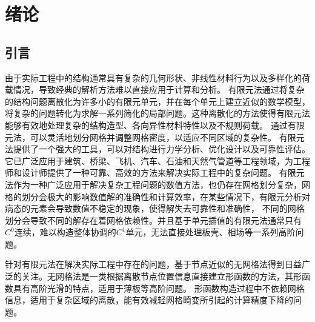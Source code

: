 \chapter{绪论}
\section{引言}
由于实际工程中的结构通常具有复杂的几何形状、非线性材料行为以及多样化的荷载情况，导致经典的解析方法难以直接应用于计算和分析。
有限元法通过将复杂的结构问题离散化为许多小的有限元单元，并在每个单元上建立近似的数学模型，将复杂的问题转化为求解一系列简化的局部问题。这种离散化的方法使得有限元法能够有效地处理复杂的结构造型、各向异性材料特性以及不规则荷载。
通过有限元法，可以灵活地划分网格并调整网格密度，以适应不同区域的复杂性。
有限元法提供了一个强大的工具，可以对结构进行力学分析、优化设计以及可靠性评估。它已广泛应用于建筑、桥梁、飞机、汽车、石油和天然气管道等工程领域，为工程师和设计师提供了一种可靠、高效的方法来解决实际工程中的复杂问题。
有限元法作为一种广泛应用于解决复杂工程问题的数值方法，也仍存在网格划分复杂，网格的划分会极大的影响数值解的准确性和计算效率，在某些情况下，有限元分析对病态的元素会导致数值不稳定的现象，使得解失去可靠性和准确性，
不同的网格划分会导致不同的解存在着网格依赖性。并且基于单元插值的有限元法通常只有$C^0$连续，难以构造整体协调的$C^1$单元，无法直接处理板壳、相场等一系列高阶问题。\par
针对有限元法在解决实际工程中存在的问题，基于节点近似的无网格法得到日益广泛的关注。无网格法是一类根据离散节点位置信息直接建立形函数的方法，其形函数具有高阶光滑的特点，适用于薄板等高阶问题。
形函数构造过程中不依赖网格信息，适用于复杂区域的离散，能有效减轻网格畸变所引起的计算精度下降的问题。

